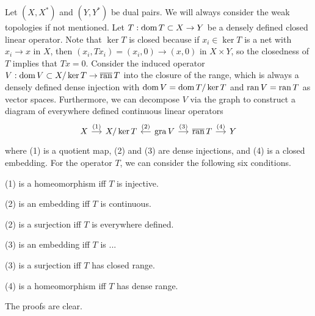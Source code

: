 \documentclass{../../large}
\begin{document}
\begin{prb}
Let $(X,X^*)$ and $(Y,Y^*)$ be dual pairs.
We will always consider the weak topologies if not mentioned.
Let $T:\operatorname{dom} T\subset X\to Y$ be a densely defined closed linear operator.
Note that $\ker T$ is closed because if $x_i\in\ker T$ is a net with $x_i\to x$ in $X$, then $(x_i,Tx_i)=(x_i,0)\to(x,0)$ in $X\times Y$, so the closedness of $T$ implies that $Tx=0$.
Consider the induced operator $V:\operatorname{dom} V\subset X/\ker T\to\overline{\operatorname{ran}}\,T$ into the closure of the range, which is always a densely defined dense injection with $\operatorname{dom} V=\operatorname{dom} T/\ker T$ and $\operatorname{ran} V=\operatorname{ran} T$ as vector spaces.
Furthermore, we can decompose $V$ via the graph to construct a diagram of everywhere defined continuous linear operators
\[\begin{tikzcd}[sep=small]
X\rar{(1)}&X/\ker T&\gra V\lar[swap]{(2)}\rar{(3)}&\bar\ran\,T\rar{(4)}&Y
\end{tikzcd}\]
where (1) is a quotient map, (2) and (3) are dense injections, and (4) is a closed embedding.
For the operator $T$, we can consider the following six conditions.
\begin{parts}
\item (1) is a homeomorphism iff $T$ is injective.
\item (2) is an embedding iff $T$ is continuous.
\item (2) is a surjection iff $T$ is everywhere defined.
\item (3) is an embedding iff $T$ is ...
\item (3) is a surjection iff $T$ has closed range.
\item (4) is a homeomorphism iff $T$ has dense range.
\end{parts}
The proofs are clear.
\end{prb}
\end{document}
